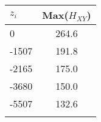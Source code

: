 \documentclass{standalone}
\newcommand{\dtoprule}{\specialrule{1pt}{0pt}{0.4pt}%
            \specialrule{0.3pt}{0pt}{\belowrulesep}%
            }
\newcommand{\dbottomrule}{\specialrule{0.3pt}{0pt}{0.4pt}%
            \specialrule{1pt}{0pt}{\belowrulesep}%
            }
\begin{document}

\begin{tabular}{lc}
    \dtoprule
    \rowcolor{LightCyan}
    $z_i$ & Max($H_{XY}$) \\
    \midrule
    0     & 264.6         \\
    -1507 & 191.8         \\
    -2165 & 175.0         \\
    -3680 & 150.0         \\
    -5507 & 132.6         \\
    \dbottomrule
\end{tabular}
\end{document}
